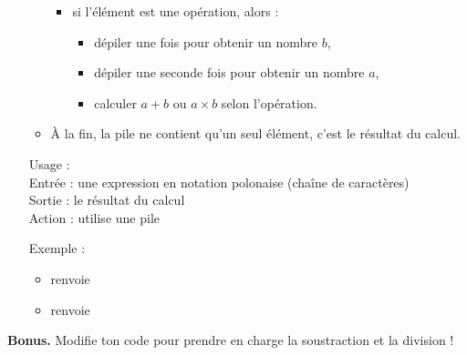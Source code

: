 \documentclass[11pt,class=report,crop=false]{standalone}
\begin{document}
\begin{activite}
\begin{enumerate}
\begin{algorithme}
\begin{itemize}
\begin{itemize}
     \item si l'élément est une opération, alors :
       \begin{itemize}
         \item dépiler une fois pour obtenir un nombre $b$,
         \item dépiler une seconde fois pour obtenir un nombre $a$,
         \item calculer $a+b$ ou $a \times b$ selon l'opération.
       \end{itemize}
     \end{itemize}   
   \item À la fin, la pile ne contient qu'un seul élément, c'est le résultat du calcul.
   
 \end{itemize}  
 \end{algorithme}

\begin{fonction}
  Usage :  \\
  Entrée : une expression en notation polonaise (chaîne de caractères) \\
  Sortie : le résultat du calcul \\
  Action : utilise une pile
   
  \medskip
   
  Exemple : 
  \begin{itemize}
    \item {} renvoie 
    \item {} renvoie 
    \end{itemize}    
\end{fonction}  
  
\end{enumerate} 

\textbf{Bonus.} Modifie ton code pour prendre en charge la soustraction et la division !
\end{activite}



\end{document}
